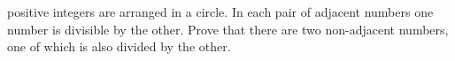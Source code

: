  positive integers are arranged in a circle.
In each pair of adjacent numbers one number is divisible by the other.
Prove that there are two non-adjacent numbers, one of which is also divided by
the other.
\solution
\endproblem
